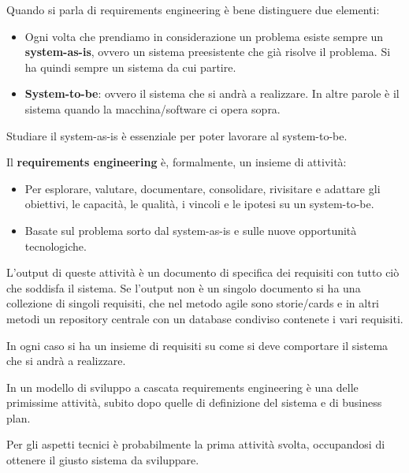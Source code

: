 Quando si parla di requirements engineering è bene distinguere due elementi:
\begin{itemize}
      \item Ogni volta che prendiamo in considerazione un problema esiste sempre
            un \textbf{system-as-is}, ovvero un sistema preesistente che già
            risolve il problema. Si ha quindi sempre un sistema da cui partire.
      \item \textbf{System-to-be}: ovvero il sistema che si andrà a realizzare.
            In altre parole è il sistema quando la macchina/software ci opera sopra.
\end{itemize}
Studiare il system-as-is è essenziale per poter lavorare al system-to-be.
\begin{definizione}
      Il \textbf{requirements engineering} è, formalmente, un insieme di attività:
      \begin{itemize}
            \item Per esplorare, valutare, documentare, consolidare, rivisitare
                  e adattare gli obiettivi, le capacità, le qualità, i vincoli e
                  le ipotesi su un system-to-be.
            \item Basate sul problema sorto dal system-as-is e sulle nuove
                  opportunità tecnologiche.
      \end{itemize}
      L'output di queste attività è un documento di specifica dei requisiti con
      tutto ciò che soddisfa il sistema. Se l'output non è un singolo documento
      si ha una collezione di singoli requisiti, che nel metodo agile sono
      storie/cards e in altri metodi un repository centrale con un database
      condiviso contenete i vari requisiti.

      In ogni caso si ha un insieme di requisiti su come si deve comportare il
      sistema che si andrà a realizzare.
\end{definizione}
In un modello di sviluppo a cascata requirements engineering è una delle
primissime attività, subito dopo quelle di definizione del sistema e di business
plan.

Per gli aspetti tecnici è probabilmente la prima attività svolta, occupandosi di
ottenere il giusto sistema da sviluppare.

